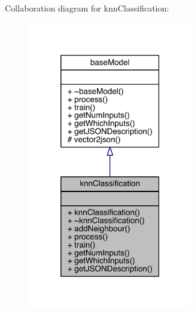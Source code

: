 Collaboration diagram for knn\+Classification\+:\nopagebreak
\begin{figure}[H]
\begin{center}
\leavevmode
\includegraphics[width=202pt]{classknn_classification__coll__graph}
\end{center}
\end{figure}

